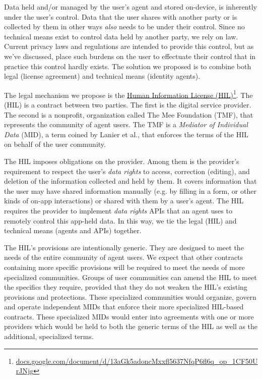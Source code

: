 \documentclass[11pt, oneside]{article}   	%
\newcommand{\hyperfootnote}[1][]{\def\ArgI{{#1}}\hyperfootnoteRelay}
\newcommand\hyperfootnoteRelay[2][]{\href{#1#2}{\ArgI}\footnote{\href{#1#2}{#2}}}
\begin{document}
Data held and/or managed by the user's agent and stored on-device, is inherently under the user's control. Data that the user shares with another party or is collected by them in other ways \emph{also} needs to be under their control. Since no technical means exist to control data held by another party, we rely on law. Current privacy laws and regulations are intended to provide this control, but as we've discussed, place such burdens on the user to effectuate their control that in practice this control hardly exists. The solution we proposed is to combine both legal (license agreement) and technical means (identity agents). 

The legal mechanism we propose is the \hyperfootnote[Human Information License (HIL)][https://]{docs.google.com/document/d/13aGk5adoncMxxfl5637NfqP6fl6q\_op\_1CF50UrJNjg}. The (HIL) is a contract between two parties. The first is the digital service provider. The second is a nonprofit, organization called The Mee Foundation (TMF), that represents the community of agent users. The TMF is a \emph{Mediator of Individual Data} (MID), a term coined by Lanier et al.\cite{Lanier2018}, that enforces the terms of the HIL on behalf of the user community. 

The HIL imposes obligations on the provider. Among them is the provider's requirement to respect the user's \emph{data rights} to access, correction (editing), and deletion of the information collected and held by them. It covers information that the user may have shared information manually (e.g. by filling in a form, or other kinds of on-app interactions) or shared with them by a user's agent. The HIL requires the provider to implement \emph{data rights} APIs that an agent uses to remotely control this app-held data. In this way, we tie the legal (HIL) and technical means (agents and APIs) together.

The HIL's provisions are intentionally generic. They are designed to meet the needs of the entire community of agent users. We expect that other contracts containing more specific provisions will be required to meet the needs of more specialized communities. Groups of user communities can amend the HIL to meet the specifics they require, provided that they do not weaken the HIL's existing provisions and protections. These specialized communities would organize, govern and operate independent MIDs that enforce their more specialized HIL-based contracts. These specialized MIDs would enter into agreements with one or more providers which would be held to both the generic terms of the HIL as well as the additional, specialized terms.
\end{document}
